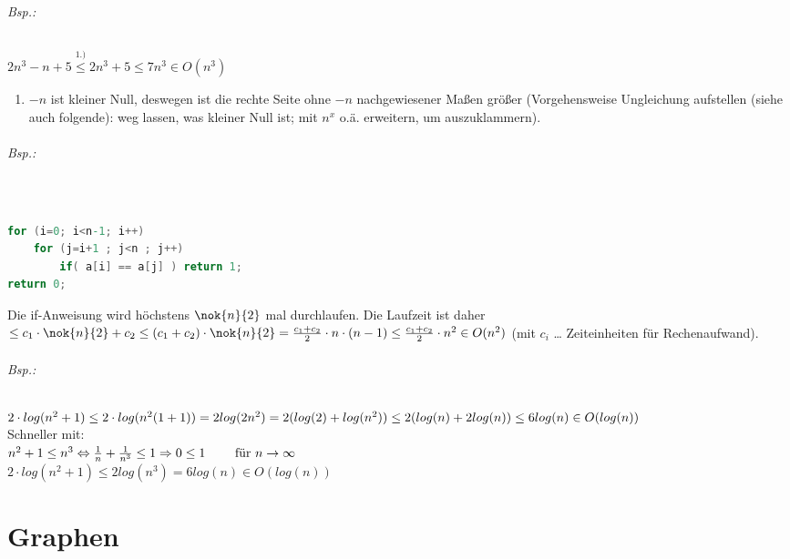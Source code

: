 \subparagraph{Bsp.:} $2n^3-n+5\overset{1.)}{\leq} 2n^3+5 \leq 7n^3 \in O(n^3)$
\begin{enumerate}
\item $-n$ ist kleiner Null, deswegen ist die rechte Seite ohne $-n$ nachgewiesener Maßen größer (Vorgehensweise Ungleichung aufstellen (siehe auch folgende): weg lassen, was kleiner Null ist; mit $n^x$ o.ä. erweitern, um auszuklammern).
\end{enumerate}

\subparagraph{Bsp.:}$ $
\begin{lstlisting}[language=C]
for (i=0; i<n-1; i++)
	for (j=i+1 ; j<n ; j++)
		if( a[i] == a[j] ) return 1;
return 0;
\end{lstlisting}
Die if-Anweisung wird höchstens $\nok{n}{2}$ mal durchlaufen. Die Laufzeit ist daher $\leq c_1 \cdot \nok{n}{2} + c_2 \leq (c_1+c_2) \cdot \nok{n}{2} = \frac{c_1+c_2}{2}\cdot n \cdot (n-1)\leq \frac{c_1 + c_2}{2}\cdot n^2 \in O(n^2)$ (mit $c_i$ … Zeiteinheiten für Rechenaufwand).
\subparagraph{Bsp.:} $2\cdot log(n^2+1)\\
\leq 2 \cdot log (n^2(1+1))\\
=2log(2n^2)=2(log(2)+log(n^2)) \\
\leq 2(log(n)+2log(n))\\
\leq 6 log(n) \in O(log(n))$\\
Schneller mit:\\
$n^2+1\leq n^3 \Leftrightarrow \\
\frac{1}{n}+\frac{1}{n^3}\leq 1 \Rightarrow \\
0\leq 1 \qquad \text{ für } n \rightarrow\infty$\\
$2\cdot log(n^2+1)\leq 2 log (n^3)=6log(n)\in O(log(n))$

\chapter{Graphen}

